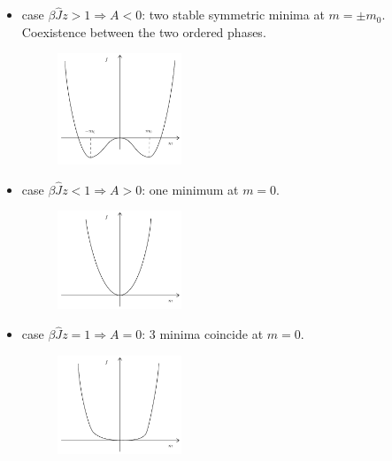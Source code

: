 \documentclass[../main/main.tex]{subfiles}
\begin{document}
\begin{itemize}
\item case \( \beta \hat{J} z > 1 \Rightarrow A<0 \): two stable symmetric minima at \( m= \pm m_0 \). Coexistence between the two ordered phases.
\begin{figure}[h!]
\centering
\includegraphics[width=0.35\textwidth]{../lessons/11_image/2.pdf}
\caption{\label{fig:11_2}}
\end{figure}
\item case \( \beta \hat{J} z < 1 \Rightarrow A>0 \): one minimum at \( m=0 \).
\begin{figure}[h!]
\centering
\includegraphics[width=0.35\textwidth]{../lessons/11_image/3.pdf}
\caption{\label{fig:11_3}}
\end{figure}
\item case \( \beta \hat{J} z = 1 \Rightarrow A=0 \): 3 minima coincide at \( m=0 \).

\begin{figure}[h!]
\centering
\includegraphics[width=0.35\textwidth]{../lessons/11_image/4.pdf}
\caption{\label{fig:11_4}}
\end{figure}
\end{itemize}
\end{document}
